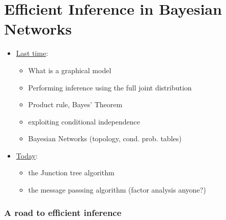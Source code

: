 \section{Efficient Inference in Bayesian Networks}

\begin{frame} 

\end{frame}

\begin{frame}

\begin{itemize}
\item \underline{Last time}:
\begin{itemize}
\item What is a graphical model
\item Performing inference using the full joint distribution
\item Product rule, Bayes' Theorem
\item exploiting conditional independence
\item Bayesian Networks (topology, cond. prob. tables)
\end{itemize}

\pause

\item \underline{Today}:
\begin{itemize}
\item the Junction tree algorithm
\item the message passsing algorithm (factor analysis anyone?)
\end{itemize}
\end{itemize}

\end{frame}

\subsubsection{A road to efficient inference}

